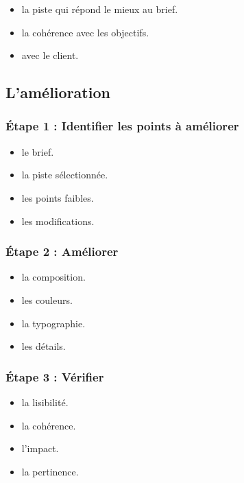 \begin{itemize}
    \item {} la piste qui répond le mieux au brief.
    \item {} la cohérence avec les objectifs.
    \item {} avec le client.
\end{itemize}

\subsection{L'amélioration}

\subsubsection{Étape 1 : Identifier les points à améliorer}

\begin{itemize}
    \item {} le brief.
    \item {} la piste sélectionnée.
    \item {} les points faibles.
    \item {} les modifications.
\end{itemize}

\subsubsection{Étape 2 : Améliorer}

\begin{itemize}
    \item {} la composition.
    \item {} les couleurs.
    \item {} la typographie.
    \item {} les détails.
\end{itemize}

\subsubsection{Étape 3 : Vérifier}

\begin{itemize}
    \item {} la lisibilité.
    \item {} la cohérence.
    \item {} l'impact.
    \item {} la pertinence.
\end{itemize}

